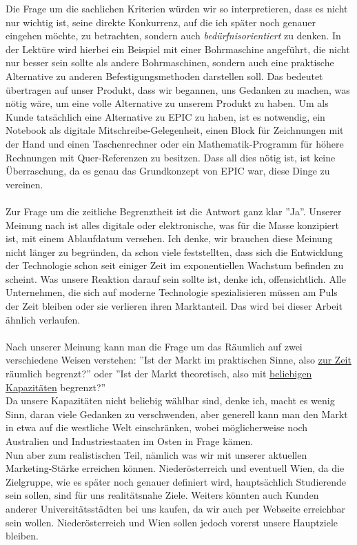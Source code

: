 Die Frage um die sachlichen Kriterien würden wir so interpretieren, dass es nicht nur wichtig ist, seine direkte Konkurrenz, auf die ich später noch genauer eingehen möchte, zu betrachten, sondern auch \textit{bedürfnisorientiert} zu denken. In der Lektüre wird hierbei ein Beispiel mit einer Bohrmaschine angeführt, die nicht nur besser sein sollte als andere Bohrmaschinen, sondern auch eine praktische Alternative zu anderen Befestigungsmethoden darstellen soll. Das bedeutet übertragen auf unser Produkt, dass wir begannen, uns Gedanken zu machen, was nötig wäre, um eine volle Alternative zu unserem Produkt zu haben. Um als Kunde tatsächlich eine Alternative zu EPIC zu haben, ist es notwendig, ein Notebook als digitale Mitschreibe-Gelegenheit, einen Block für Zeichnungen mit der Hand und einen Taschenrechner oder ein Mathematik-Programm für höhere Rechnungen mit Quer-Referenzen zu besitzen. Dass all dies nötig ist, ist keine Überraschung, da es genau das Grundkonzept von EPIC war, diese Dinge zu vereinen. \\
\\
Zur Frage um die zeitliche Begrenztheit ist die Antwort ganz klar ''Ja''. Unserer Meinung nach ist alles digitale oder elektronische, was für die Masse konzipiert ist, mit einem Ablaufdatum versehen. Ich denke, wir brauchen diese Meinung nicht länger zu begründen, da schon viele feststellten, dass sich die Entwicklung der Technologie schon seit einiger Zeit im exponentiellen Wachstum befinden zu scheint. Was unsere Reaktion darauf sein sollte ist, denke ich, offensichtlich. Alle Unternehmen, die sich auf moderne Technologie spezialisieren müssen am Puls der Zeit bleiben oder sie verlieren ihren Marktanteil. Das wird bei dieser Arbeit ähnlich verlaufen.\\
\\
Nach unserer Meinung kann man die Frage um das Räumlich auf zwei verschiedene Weisen verstehen: ''Ist der Markt im praktischen Sinne, also \underline{zur Zeit} räumlich begrenzt?'' oder ''Ist der Markt theoretisch, also mit \underline{beliebigen Kapazitäten} begrenzt?''\\
Da unsere Kapazitäten nicht beliebig wählbar sind, denke ich, macht es wenig Sinn, daran viele Gedanken zu verschwenden, aber generell kann man den Markt in etwa auf die westliche Welt einschränken, wobei möglicherweise noch Australien und Industriestaaten im Osten in Frage kämen.\\
Nun aber zum realistischen Teil, nämlich was wir mit unserer aktuellen Marketing-Stärke erreichen können. Niederösterreich und eventuell Wien, da die Zielgruppe, wie es später noch genauer definiert wird, hauptsächlich Studierende sein sollen, sind für uns realitätsnahe Ziele. Weiters könnten auch Kunden anderer Universitätsstädten bei uns kaufen, da wir auch per Webseite erreichbar sein wollen. Niederösterreich und Wien sollen jedoch vorerst unsere Hauptziele bleiben.\\

